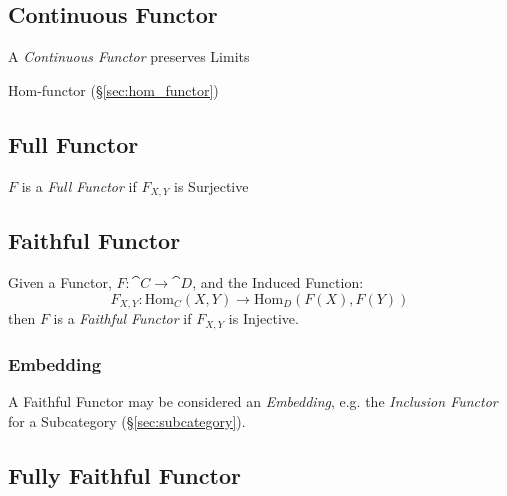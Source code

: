 \subsection{Continuous Functor}\label{sec:continuous_functor}

A \emph{Continuous Functor} preserves Limits

Hom-functor (\S\ref{sec:hom_functor})



\subsection{Full Functor}\label{sec:full_functor}

$F$ is a \emph{Full Functor} if $F_{X,Y}$ is Surjective



\subsection{Faithful Functor}\label{sec:faithful_functor}

Given a Functor, $F : \cat{C} \rightarrow \cat{D}$, and the
Induced Function:
\[
  F_{X,Y} : \mathrm{Hom}_C(X,Y) \rightarrow \mathrm{Hom}_D(F(X),F(Y))
\]
then $F$ is a \emph{Faithful Functor} if $F_{X,Y}$ is Injective.



\subsubsection{Embedding}\label{sec:category_embedding}

A Faithful Functor may be considered an \emph{Embedding}, e.g. the
\emph{Inclusion Functor} for a Subcategory
(\S\ref{sec:subcategory}).



\subsection{Fully Faithful Functor}\label{sec:fully_faithful}

